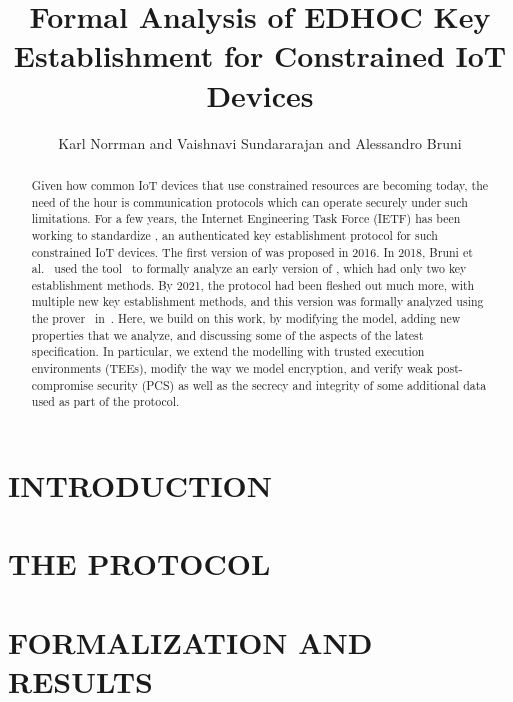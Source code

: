 \documentclass[runningheads]{llncs}
\title{Formal Analysis of EDHOC Key Establishment for Constrained IoT 
Devices}
\author{
        Karl Norrman and 
        Vaishnavi Sundararajan and
        Alessandro Bruni
}
\begin{document}
\maketitle
%
\begin{abstract}
Given how common IoT devices that use constrained resources are becoming 
today, the need of the hour is communication protocols which can operate 
securely under such limitations.
%
For a few years, the Internet Engineering Task Force (IETF) has been working 
to standardize \mEdhoc{}, an authenticated key establishment protocol for 
such constrained IoT devices.
%
The first version of \mEdhoc{} was proposed in 2016.
%
In 2018, Bruni et al.~\cite{DBLP:conf/secsr/BruniJPS18} used the \mProverif{} 
tool~\cite{DBLP:conf/csfw/Blanchet01} to formally analyze an early version of 
\mEdhoc{}, which had only two key establishment methods.  
%
By 2021, the protocol had been fleshed out much more, with multiple new key 
establishment methods, and this version was formally analyzed using the 
\mTamarin{} prover~\cite{DBLP:conf/cav/MeierSCB13} in~\cite{Norr21}.
%
Here, we build on this work, by modifying the model, adding new properties 
that we analyze, and discussing some of the aspects of the latest \mEdhoc{} 
specification. In particular, we extend the modelling with trusted execution 
environments (TEEs), modify the way we model \mXor{} encryption, and 
verify weak post-compromise security (PCS) as well as the secrecy and 
integrity of some additional data used as part of the protocol.
\end{abstract}
%
\section{\uppercase{Introduction}}
\label{sec:introduction}


\section{\uppercase{The \mEdhoc{} Protocol}}
\label{sec:edhoc}


\section{\uppercase{Formalization and Results}}
\label{sec:formalization}

\end{document}
